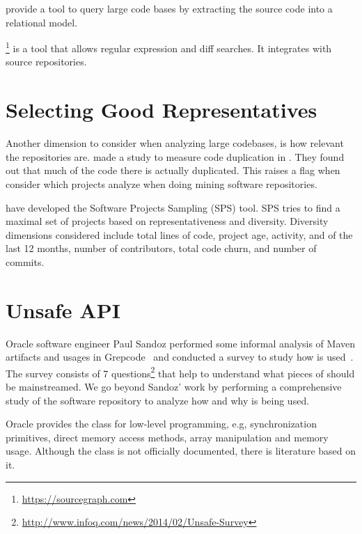 \cite{bajracharyaSourcererInternetscaleSoftware2009} provide a tool to query large code bases by extracting the source code into a relational model.

\sourcegraph{}\footnote{\url{https://sourcegraph.com}} is a tool that allows regular expression and diff searches.
It integrates with source repositories.

\section{Selecting Good Representatives}
\label{sec:lr:selection}

Another dimension to consider when analyzing large codebases, is how relevant the repositories are.
\cite{lopesDeJaVuMapCode2017} made a study to measure code duplication in \github{}.
They found out that much of the code there is actually duplicated.
This raises a flag when consider which projects analyze when doing mining software repositories.

\cite{nagappanDiversitySoftwareEngineering2013} have developed the Software Projects Sampling (SPS) tool.
SPS tries to find a maximal set of projects based on representativeness and diversity.
Diversity dimensions considered include total lines of code, project age, activity, and of the last 12 months, number of contributors, total code churn, and number of commits.


\section{Unsafe API}
\label{sec:lr:unsafe}

Oracle software engineer Paul Sandoz 
performed some informal analysis of Maven artifacts and usages in Grepcode~\cite{sandoz-personal-communication}
and conducted a survey to study how \unsafe{} is used~\cite{psandoz14}.
The survey consists of 7 questions\footnote{\url{http://www.infoq.com/news/2014/02/Unsafe-Survey}} 
that help to understand what pieces of \smu{} should be mainstreamed.
We go beyond Sandoz' work
by performing a comprehensive study of the \mavencentral{} software repository to analyze how and why \smu{} is being used.

Oracle provides the \smu{} class for low-level programming, e.g, synchronization primitives, direct memory access methods, array manipulation and memory usage.
Although the \smu{} class is not officially documented, there is literature based on it.

